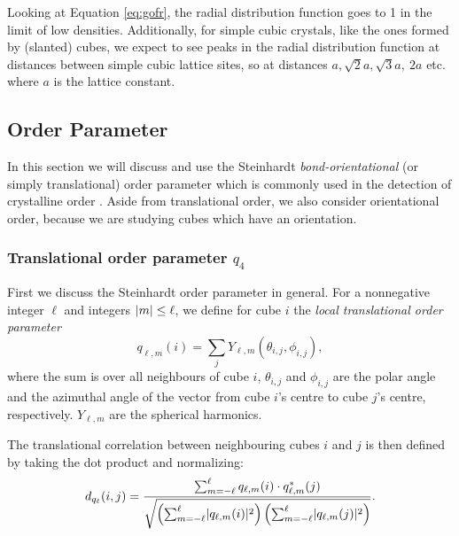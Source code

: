 \documentclass[thesis]{subfiles}
\begin{document}
Looking at Equation \ref{eq:gofr}, the radial distribution function goes to 1 in the limit of low densities. Additionally, for simple cubic crystals, like the ones formed by (slanted) cubes, we expect to see peaks in the radial distribution function at distances between simple cubic lattice sites, so at distances $a, \sqrt 2a, \sqrt 3a,\ 2a$ etc. where $a$ is the lattice constant.

\subsection{Order Parameter} \label{subsec:order}

In this section we will discuss and use the Steinhardt \emph{bond-orientational} (or simply translational) order parameter which is commonly used in the detection of crystalline order \cite{steinhardt1983bond, lechner2008accurate, van2017phase, sharma2018disorder, mickel2013shortcomings}. Aside from translational order, we also consider orientational order, because we are studying cubes which have an orientation.

\subsubsection{Translational order parameter \texorpdfstring{$q_4$}{q4}}

First we discuss the Steinhardt order parameter in general. For a nonnegative integer $\ell$ and integers $\lvert m\rvert \leq\ell$, we define for cube $i$ the \emph{local translational order parameter}
\begin{equation}
q_{\ell, m}(i) = \sum_{j} Y_{\ell, m} (\theta_{i, j}, \phi_{i, j}),
\end{equation}
where the sum is over all neighbours of cube $i$, $\theta_{i, j}$ and $\phi_{i, j}$ are the polar angle and the azimuthal angle of the vector from cube $i$'s centre to cube $j$'s centre, respectively. $Y_{\ell, m}$ are the spherical harmonics.%

The translational correlation between neighbouring cubes $i$ and $j$ is then defined by taking the dot product and normalizing:
\begin{equation}
d_{q_\ell}(i, j) = \frac{\sum_{m = -\ell}^\ell q_{\ell, m}(i) \cdot q^*_{\ell, m}(j)}{\sqrt{\left(\sum_{m = -\ell}^\ell \lvert q_{\ell, m}(i)\rvert^2\right) \left(\sum_{m = -\ell}^\ell \lvert q_{\ell, m}(j)\rvert^2\right)}}.
\end{equation}
\end{document}
